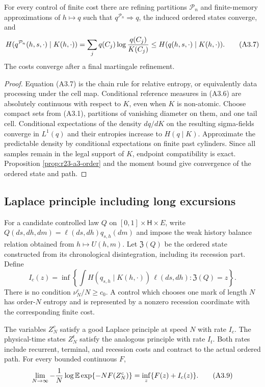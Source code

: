 \begin{lemma}
\label{lem:r23-a3-recovery}
For every control of finite cost there are refining partitions
$\mathcal P_n$ and finite-memory approximations of $h\mapsto q$ such that
$q^{\mathcal P_n}\Rightarrow q$, the induced ordered states converge, and
\[
 H(q^{\mathcal P_n}(h,s,\cdot)\mid K(h,\cdot))
 =\sum_jq(C_j)\log{q(C_j)\over K(C_j)}
 \le H(q(h,s,\cdot)\mid K(h,\cdot)).                     \tag{A3.7}
\]
The costs converge after a final martingale refinement.
\end{lemma}

\begin{proof}
Equation (A3.7) is the chain rule for relative entropy, or equivalently data
processing under the cell map.  Conditional reference measures in (A3.6) are
absolutely continuous with respect to $K$, even when $K$ is non-atomic.
Choose compact sets from (A3.1), partitions of vanishing diameter on them, and
one tail cell.  Conditional expectations of the density $dq/dK$ on the
resulting sigma-fields converge in $L^1(q)$ and their entropies increase to
$H(q\mid K)$.  Approximate the predictable density by conditional
expectations on finite past cylinders.  Since all samples remain in the legal
support of $K$, endpoint compatibility is exact.  Proposition
\ref{prop:r23-a3-order} and the moment bound give convergence of the ordered
state and path.
\end{proof}

\subsection{Laplace principle including long excursions}

For a candidate controlled law $Q$ on
$[0,1]\times\mathsf H\times E$, write $Q(ds,dh,dm)=
\ell(ds,dh)q_{s,h}(dm)$ and impose the weak history balance relation obtained
from $h\mapsto U(h,m)$.  Let $\mathfrak Z(Q)$ be the ordered state constructed
from its chronological disintegration, including its recession part.  Define
\[
 I_c(z)=\inf\left\{
 \int H(q_{s,h}\mid K(h,\cdot))\,\ell(ds,dh):
 \mathfrak Z(Q)=z\right\}.                               \tag{A3.8}
\]
There is no condition $\nu_N^c/N\ge c_0$.  A control which chooses one mark of
length $N$ has order-$N$ entropy and is represented by a nonzero recession
coordinate with the corresponding finite cost.

\begin{theorem}
\label{thm:r23-a3-ldp}
The variables $Z_N^c$ satisfy a good Laplace principle at speed $N$ with rate
$I_c$.  The physical-time states $Z_N^t$ satisfy the analogous principle with
rate $I_t$.  Both rates include recurrent, terminal, and recession costs and
contract to the actual ordered path.  For every bounded continuous $F$,
\[
 \lim_{N\to\infty}-{1\over N}
 \log\mathbb E\exp\{-NF(Z_N^c)\}
 =\inf_z\{F(z)+I_c(z)\}.                                  \tag{A3.9}
\]
\end{theorem}

